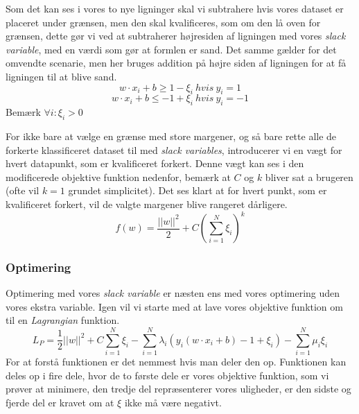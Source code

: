 \documentclass{article}
\begin{document}
 Som det kan ses i vores to nye ligninger skal vi subtrahere hvis vores dataset er placeret under grænsen, men den skal kvalificeres, som om den lå oven for grænsen, dette gør vi ved at subtraherer  højresiden af ligningen med vores \textit{slack variable}, med en værdi som gør at formlen er sand. Det samme gælder for det omvendte scenarie, men her bruges addition på højre siden af ligningen for at få ligningen til at blive sand.  
\begin{equation}
\label{eq:slack_hyperplane_1}
w \cdot x_i + b \geq 1 - \xi_i \ hvis \ y_i = 1
\end{equation}
\begin{equation}
\label{eq:slack_hyperplane_2}
w \cdot x_i + b \leq -1 +\xi_i \ hvis \ y_i = -1
\end{equation}
Bemærk $\forall i : \xi_i > 0$

For ikke bare at vælge en grænse med store margener, og så bare rette alle de forkerte klassificeret dataset til med \textit{slack variables}, introducerer vi en vægt for hvert datapunkt, som er kvalificeret forkert. Denne vægt kan ses i den modificerede objektive funktion nedenfor, bemærk at $C$ og $k$ bliver sat a brugeren (ofte vil $k = 1$ grundet simplicitet). Det ses klart at for hvert punkt, som er kvalificeret forkert, vil de valgte margener blive rangeret dårligere. 
\begin{equation}
\label{eq:slack_objective_function}
f(w) = \frac{||w||^2}{2}+C(\sum\limits_{i=1}^N \xi_i)^k
\end{equation}

\subsubsection{Optimering}
Optimering med vores \textit{slack variable} er næsten ens med vores optimering uden vores ekstra variable. Igen vil vi starte med at lave vores objektive funktion om til en \textit{Lagrangian} funktion.
\begin{equation}
\label{eq:slack_L_P}
L_P = \frac{1}{2}||w||^2 + C \sum\limits_{i=1}^N \xi_i - \sum\limits_{i=1}^N \lambda_i (y_i(w \cdot x_i + b) - 1 + \xi_i) - \sum\limits_{i=1}^N \mu_i \xi_i
\end{equation}
For at forstå funktionen er det nemmest hvis man deler den op. Funktionen kan deles op i fire dele, hvor de to første dele er vores objektive funktion, som vi prøver at minimere, den tredje del  repræsenterer vores uligheder, er den sidste og fjerde del er kravet om at $\xi$ ikke må være negativt. 
\end{document}
